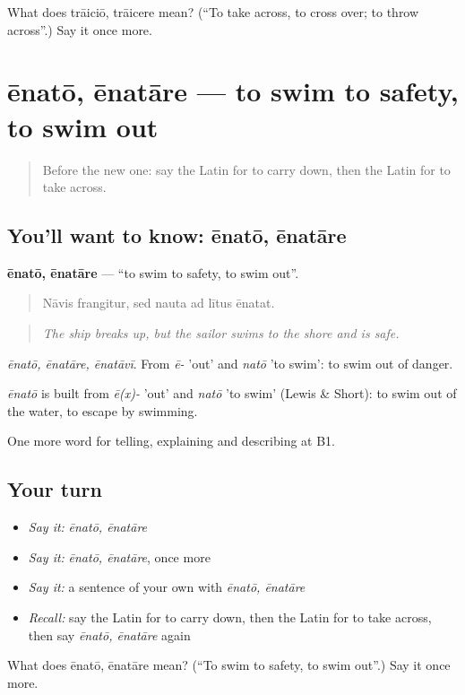 \begin{tcolorbox}[breakable,colback=teal!4,colframe=teal!35!black,title={Before you move on}]
What does trāiciō, trāicere mean? (\textquotedblleft{}To take across, to cross over; to throw across\textquotedblright{}.) Say it once more.
\end{tcolorbox}
\section[ēnatō, ēnatāre]{ēnatō, ēnatāre — to swim to safety, to swim out}

\label{lesson:LA-C440-enato}



\begin{quote}
Before the new one: say the Latin for to carry down, then the Latin for to take across.
\end{quote}

\subsection*{You'll want to know: ēnatō, ēnatāre}
\textbf{ēnatō, ēnatāre} — \textquotedblleft{}to swim to safety, to swim out\textquotedblright{}.

\begin{quote}
Nāvis frangitur, sed nauta ad lītus ēnatat.
\end{quote}

\begin{quote}
\emph{The ship breaks up, but the sailor swims to the shore and is safe.}
\end{quote}

\emph{ēnatō, ēnatāre, ēnatāvī}. From \emph{ē-} 'out' and \emph{natō} 'to swim': to swim out of danger.

\begin{cousinweb}
\emph{ēnatō} is built from \emph{ē(x)-} 'out' and \emph{natō} 'to swim' (Lewis \& Short): to swim out of the water, to escape by swimming.
\end{cousinweb}

\begin{grammarlens}[title={What you've built}]
One more word for telling, explaining and describing at B1.
\end{grammarlens}

\subsection*{Your turn}
\begin{itemize}
\raggedright
  \item \emph{Say it:} \emph{ēnatō, ēnatāre}
  \item \emph{Say it:} \emph{ēnatō, ēnatāre}, once more
  \item \emph{Say it:} a sentence of your own with \emph{ēnatō, ēnatāre}
  \item \emph{Recall:} say the Latin for to carry down, then the Latin for to take across, then say \emph{ēnatō, ēnatāre} again
\end{itemize}

\begin{tcolorbox}[breakable,colback=teal!4,colframe=teal!35!black,title={Before you move on}]
What does ēnatō, ēnatāre mean? (\textquotedblleft{}To swim to safety, to swim out\textquotedblright{}.) Say it once more.
\end{tcolorbox}
